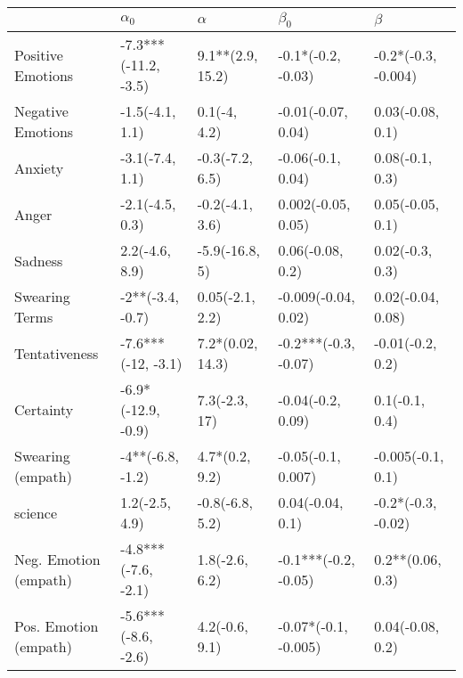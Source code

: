\begin{tabular}{lllll}
\toprule
{} &            $\alpha_0$ &          $\alpha$ &             $\beta_0$ &              $\beta$ \\
\midrule
Positive Emotions     &  -7.3***(-11.2, -3.5) &  9.1**(2.9, 15.2) &    -0.1*(-0.2, -0.03) &  -0.2*(-0.3, -0.004) \\
Negative Emotions     &       -1.5(-4.1, 1.1) &      0.1(-4, 4.2) &    -0.01(-0.07, 0.04) &     0.03(-0.08, 0.1) \\
Anxiety               &       -3.1(-7.4, 1.1) &   -0.3(-7.2, 6.5) &     -0.06(-0.1, 0.04) &      0.08(-0.1, 0.3) \\
Anger                 &       -2.1(-4.5, 0.3) &   -0.2(-4.1, 3.6) &    0.002(-0.05, 0.05) &     0.05(-0.05, 0.1) \\
Sadness               &        2.2(-4.6, 8.9) &    -5.9(-16.8, 5) &      0.06(-0.08, 0.2) &      0.02(-0.3, 0.3) \\
Swearing Terms        &      -2**(-3.4, -0.7) &   0.05(-2.1, 2.2) &   -0.009(-0.04, 0.02) &    0.02(-0.04, 0.08) \\
Tentativeness         &    -7.6***(-12, -3.1) &  7.2*(0.02, 14.3) &  -0.2***(-0.3, -0.07) &     -0.01(-0.2, 0.2) \\
Certainty             &    -6.9*(-12.9, -0.9) &     7.3(-2.3, 17) &     -0.04(-0.2, 0.09) &       0.1(-0.1, 0.4) \\
Swearing (empath)     &      -4**(-6.8, -1.2) &    4.7*(0.2, 9.2) &    -0.05(-0.1, 0.007) &    -0.005(-0.1, 0.1) \\
science               &        1.2(-2.5, 4.9) &   -0.8(-6.8, 5.2) &      0.04(-0.04, 0.1) &   -0.2*(-0.3, -0.02) \\
Neg. Emotion (empath) &   -4.8***(-7.6, -2.1) &    1.8(-2.6, 6.2) &  -0.1***(-0.2, -0.05) &     0.2**(0.06, 0.3) \\
Pos. Emotion (empath) &   -5.6***(-8.6, -2.6) &    4.2(-0.6, 9.1) &  -0.07*(-0.1, -0.005) &     0.04(-0.08, 0.2) \\
\bottomrule
\end{tabular}
